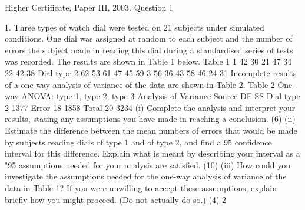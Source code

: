 \documentclass[a4paper,12pt]{article}
\begin{document}
Higher Certificate, Paper III, 2003. Question 1
\begin{framed}
1.
Three types of watch dial were tested on 21 subjects under simulated conditions. One
dial was assigned at random to each subject and the number of errors the subject made
in reading this dial during a standardised series of tests was recorded. The results are
shown in Table 1 below.
Table 1
1
42
30
21
47
34
22
42
38
Dial type
2
62
53
61
47
45
59
3
56
36
43
58
46
24
31
Incomplete results of a one-way analysis of variance of the data are shown in Table 2.
Table 2
One-way ANOVA: type 1, type 2, type 3
Analysis of Variance
Source
DF
SS
Dial type
2
1377
Error
18
1858
Total
20
3234
(i) Complete the analysis and interpret your results, stating any assumptions you
have made in reaching a conclusion.
(6)
(ii) Estimate the difference between the mean numbers of errors that would be
made by subjects reading dials of type 1 and of type 2, and find a 95%
confidence interval for this difference. Explain what is meant by describing
your interval as a "95%
assumptions needed for your analysis are satisfied.
(10)
(iii) How could you investigate the assumptions needed for the one-way analysis of
variance of the data in Table 1? If you were unwilling to accept these
assumptions, explain briefly how you might proceed. (Do not actually do so.)
(4)
2

\end{framed}
\end{document}
